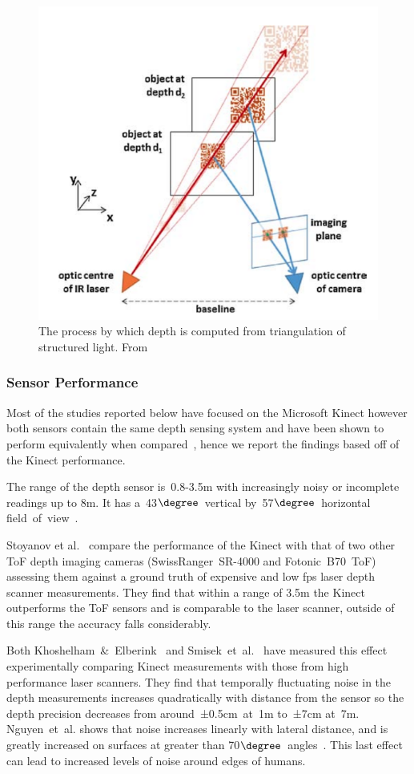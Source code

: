 \documentclass[11pt]{article} %
\begin{document}
\begin{figure}
\centering
\includegraphics*[width=0.45\linewidth,clip,trim={1.2cm 1cm 0.7cm 1.5cm}]{kinectMeasure}%
\caption{The process by which depth is computed from triangulation of structured light. From \cite{Han2013}		\label{fig:kinectMeasure}}
\end{figure}

\subsubsection{Sensor Performance}
\label{sec:senPerf}

Most of the studies reported below have focused on the Microsoft Kinect however both sensors contain the same depth sensing system and have been shown to perform equivalently when compared~\cite{Gonzalez-Jorge2013}, hence we report the findings based off of the Kinect performance.

The range of the depth sensor is~0.8-3.5m with increasingly noisy or incomplete readings up to 8m. It has a~43$\degree$~vertical by~57$\degree$~horizontal field~of~view~\cite{Han2013}.

Stoyanov et al.~\cite{StoyanovTodorandLouloudiAthanasiaandAndreassonHenrikandLilienthal2011a} compare the performance of the Kinect with that of two other ToF depth imaging cameras (SwissRanger~SR-4000 and Fotonic~B70~ToF) assessing them against a ground truth of expensive and low fps laser depth scanner measurements. They find that within a range of 3.5m the Kinect outperforms the ToF sensors and is comparable to the laser scanner, outside of this range the accuracy falls considerably.

Both Khoshelham~\&~Elberink~\cite{Khoshelham2012a} and Smisek~et~al.~\cite{Smisek2011} have measured this effect experimentally comparing Kinect measurements with those from high performance laser scanners. They find that temporally fluctuating noise in the depth measurements increases quadratically with distance from the sensor so the depth precision decreases from around~±0.5cm~at~1m to~±7cm at~7m. Nguyen~et~al. shows that noise increases linearly with lateral distance, and is greatly increased on surfaces at greater than 70$\degree$~angles~\cite{Nguyen2012}. This last effect can lead to increased levels of noise around edges of humans. 
\end{document}
